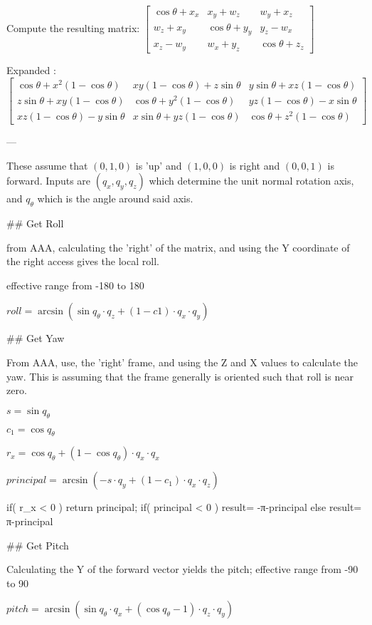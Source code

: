 Compute the resulting matrix: $\begin{bmatrix}
\cos \theta+x_x &  x_y + w_z      & w_y + x_z \\
 w_z + x_y      & \cos \theta+y_y & y_z - w_x \\
 x_z - w_y      &  w_x + y_z      & \cos \theta+z_z
\end{bmatrix} $
 

Expanded : $    \begin{bmatrix}
\cos \theta+x^2 (1-\cos \theta)     &   xy(1-\cos \theta) + z\sin \theta & y\sin \theta + xz(1-\cos \theta) \\
 z\sin \theta + xy(1-\cos \theta)   & \cos \theta+y^2 (1-\cos \theta)    & yz(1-\cos \theta) - x\sin \theta \\
xz(1-\cos \theta) - y\sin \theta    &  x\sin \theta + yz(1-\cos \theta)  & \cos \theta+z^{2}(1-\cos \theta)
\end{bmatrix} $


---

These assume that $(0,1,0)$ is 'up' and $(1,0,0)$ is right and $(0,0,1)$ is forward.
Inputs are $(q_x,q_y,q_z)$ which determine the unit normal rotation axis, and $q_{\theta}$ which is the angle around said axis.

## Get Roll

from AAA, calculating the 'right' of the matrix, and using the Y coordinate of the right access gives the local roll.

effective range from -180 to 180


${roll} = \arcsin ({ \sin q_{\theta} \cdot q_z  + (1- c1) \cdot q_x \cdot q_y } )$


## Get Yaw

From AAA, use, the 'right' frame, and using the Z and X values to calculate the yaw.  This is assuming that
the frame generally is oriented such that roll is near zero.

$ s = \sin q_θ$

$ c_1 = \cos q_θ$

$ r_x = \cos q_θ      + (1- \cos q_θ) \cdot q_x \cdot q_x $

$ {principal} = \arcsin( -s \cdot q_y  + (1- c_1)\cdot q_x \cdot q_z)$

    if( r_x < 0 ) return principal;
    if( principal < 0 ) {
        result= -π-principal
    } else {
        result= π-principal
    }                           	
	


## Get Pitch

Calculating the Y of the forward vector yields the pitch; effective range from -90 to 90

$ {pitch} = \arcsin ( \sin  q_θ \cdot q_x + (\cos q_θ-1) \cdot q_z \cdot q_y ) $

